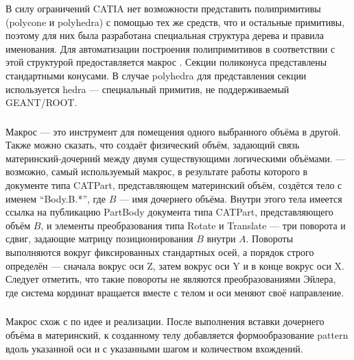 В силу ограничений CATIA нет возможности представить полипримитивы (polycone и polyhedra) с помощью тех же средств, что и остальные примитивы, поэтому для них была разработана специальная структура дерева и правила именования. Для автоматизации построения полипримитивов в соответствии с этой структурой предоставляется макрос . Секции поликонуса представлены стандартными конусами. В случае polyhedra для представления секции используется hedra --- специальный примитив, не поддерживаемый GEANT/ROOT.

\subsubsection{}\label{sec:Inserter}

Макрос  --- это инструмент для помещения одного выбранного объёма в другой. Также можно сказать, что  создаёт физический объём, задающий связь материнский-дочерний между двумя существующими логическими объёмами.  --- возможно, самый используемый макрос, в результате работы которого в документе типа CATPart, представляющем материнский объём, создётся тело с именем ``Body.B.*'', где $B$ --- имя дочернего объёма. Внутри этого тела имеется ссылка на публикацию PartBody документа типа CATPart, представляющего объём $B$, и элементы преобразования типа Rotate и Translate --- три поворота и сдвиг, задающие матрицу позиционирования $B$ внутри $A$. Повороты выполняются вокруг фиксированных стандартных осей, а порядок строго определён --- сначала вокрус оси Z, затем вокрус оси Y и в конце вокрус оси X. Следует отметить, что такие повороты не являются преобразованиями Эйлера, где система кординат вращается вместе с телом и оси меняют своё направление.

\subsubsection{}\label{sec:ArrayMaker}


Макрос  схож с  по идее и реализации. После выполнения вставки дочернего объёма в материнский, к созданному телу добавляется формообразование pattern вдоль указанной оси и с указанными шагом и количеством вхождений.

\subsubsection{}\label{sec:Replica}

